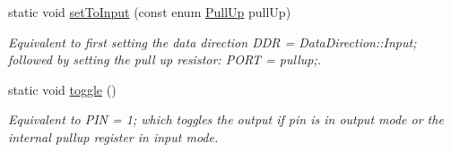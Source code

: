 \begin{DoxyCompactItemize}
\hypertarget{structports_1_1Pin_ae2f380ea5586a2eaa6e0d0b85dbf0983}{}\label{structports_1_1Pin_ae2f380ea5586a2eaa6e0d0b85dbf0983} 
static void \hyperlink{structports_1_1Pin_ae2f380ea5586a2eaa6e0d0b85dbf0983}{set\+To\+Input} (const enum \hyperlink{namespaceports_a49bf0ccedb4cfed89a328574e53bec07}{Pull\+Up} pull\+Up)
\begin{DoxyCompactList}\small\item\em Equivalent to first setting the data direction {\ttfamily D\+DR = Data\+Direction\+::\+Input;} followed by setting the pull up resistor\+: {\ttfamily P\+O\+RT = pullup;}. \end{DoxyCompactList}\item 
\hypertarget{structports_1_1Pin_a3caf6009548ed46020910f36d2b0f4f9}{}\label{structports_1_1Pin_a3caf6009548ed46020910f36d2b0f4f9} 
static void \hyperlink{structports_1_1Pin_a3caf6009548ed46020910f36d2b0f4f9}{toggle} ()
\begin{DoxyCompactList}\small\item\em Equivalent to {\ttfamily P\+IN = 1;} which toggles the output if pin is in output mode or the internal pullup register in input mode. \end{DoxyCompactList}\end{DoxyCompactItemize}
